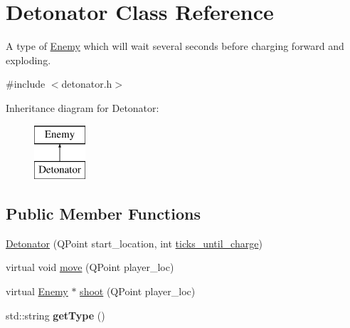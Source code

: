 \hypertarget{classDetonator}{
\section{Detonator Class Reference}
\label{classDetonator}
}


A type of \hyperlink{classEnemy}{Enemy} which will wait several seconds before charging forward and exploding.  




{\ttfamily \#include $<$detonator.h$>$}

Inheritance diagram for Detonator:\begin{figure}[H]
\begin{center}
\leavevmode
\includegraphics[height=2.000000cm]{classDetonator}
\end{center}
\end{figure}
\subsection*{Public Member Functions}
\begin{DoxyCompactItemize}
\item 
\hyperlink{classDetonator_a15cee4b47245eb2caddf888ad450c7b8}{Detonator} (QPoint start\_\-location, int \hyperlink{classDetonator_ad77bbede7489db9a9bf5e55b58149afb}{ticks\_\-until\_\-charge})
\item 
virtual void \hyperlink{classDetonator_a2021949019736250754c3f43d86d164c}{move} (QPoint player\_\-loc)
\item 
virtual \hyperlink{classEnemy}{Enemy} $\ast$ \hyperlink{classDetonator_ac18fc8d1ca73813df44799da4fcb86f4}{shoot} (QPoint player\_\-loc)
\item 
\hypertarget{classDetonator_aaa19a766d6fc496aa69e991cb07b3605}{
std::string {\bfseries getType} ()}
\label{classDetonator_aaa19a766d6fc496aa69e991cb07b3605}

\end{DoxyCompactItemize}
